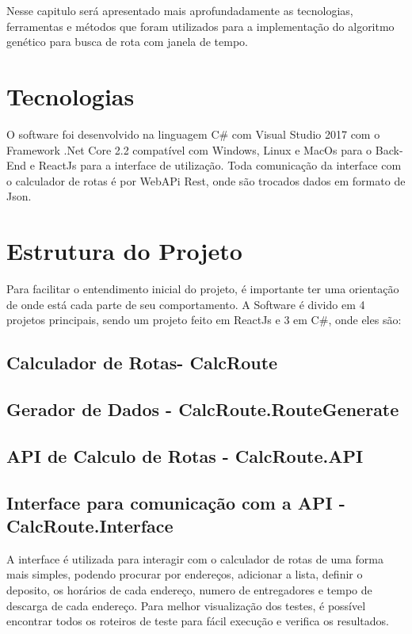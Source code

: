 Nesse capitulo será apresentado mais aprofundadamente as tecnologias, ferramentas e métodos que foram utilizados para a implementação do algoritmo genético para busca de rota com janela de tempo.

\section{Tecnologias}

O software foi desenvolvido na linguagem C\# com Visual Studio 2017 com o Framework  .Net Core 2.2 compatível com Windows, Linux e MacOs para o Back-End e ReactJs para a interface de utilização.
Toda comunicação da interface com o calculador de rotas é por WebAPi Rest, onde são trocados dados em formato de Json.

\section{Estrutura do Projeto}

Para facilitar o entendimento inicial do projeto, é importante ter uma orientação de onde está cada parte de seu comportamento. A Software é divido em 4 projetos principais, sendo um projeto feito em ReactJs e 3 em C\#, onde eles são:

\subsection{Calculador de Rotas- CalcRoute}

\subsection{Gerador de Dados - CalcRoute.RouteGenerate}

\subsection{API de Calculo de Rotas - CalcRoute.API}

\subsection{Interface para comunicação com a API - CalcRoute.Interface}

A interface é utilizada para interagir com o calculador de rotas de uma forma mais simples, podendo procurar por endereços, adicionar a lista, definir o deposito, os horários de cada endereço, numero de entregadores e tempo de descarga de cada endereço. Para melhor visualização dos testes, é possível encontrar todos os roteiros de teste para fácil execução e verifica os resultados.

